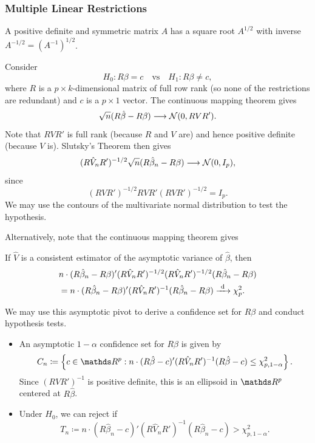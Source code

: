 \documentclass[letterpaper, 10pt]{article}
\begin{document}
\subsubsection{Multiple Linear Restrictions}
\begin{proposition}
  A positive definite and symmetric matrix \(A\) has a square root \(A^{1 / 2}\) with inverse \(A^{-1 / 2} = (A^{-1})^{1 / 2}\).
\end{proposition}

Consider
\[
  H_0: R \beta = c \quad\text{vs}\quad H_1: R \beta \neq c,
\]
where \(R\) is a \(p \times k\)-dimensional matrix of full row rank (so none of the restrictions are redundant) and \(c\) is a \(p \times 1\) vector.
The continuous mapping theorem gives
\[
  \sqrt{n} (R \hat{\beta} - R \beta)
  \longrightarrow \mathcal{N}(0, RVR').
\]
Note that \(R V R'\) is full rank (because \(R\) and \(V\) are) and hence positive definite (because \(V\) is).
Slutsky's Theorem then gives
\[
  (R \hat{V}_n R')^{- 1 / 2} \sqrt{n} (R \hat{\beta}_n - R \beta)
  \longrightarrow \mathcal{N}(0, I_p),
\]
since
\[
  (RVR')^{- 1 / 2} R V R' (R V R')^{- 1 / 2}
  = I_p.
\]
We may use the contours of the multivariate normal distribution to test the hypothesis.

Alternatively, note that the continuous mapping theorem gives
\begin{proposition}
  If \(\hat{V}\) is a consistent estimator of the asymptotic variance of \(\hat{\beta}\), then
  \begin{align*}
    &n \cdot (R \hat{\beta}_n - R \beta)' (R \hat{V}_n R')^{- 1 / 2} 
    (R \hat{V}_n R')^{- 1 / 2} (R \hat{\beta}_n - R \beta) \\
    &= n \cdot (R \hat{\beta}_n - R \beta)' (R \hat{V}_n R')^{-1} (R \hat{\beta}_n - R \beta)
    \xrightarrow{\ \mathrm{d}\ } \chi_p^2.
  \end{align*}
\end{proposition}

We may use this asymptotic pivot to derive a confidence set for \(R \beta\) and conduct hypothesis tests.
\begin{itemize}
  \item An asymptotic \(1 - \alpha\) confidence set for \(R \beta\) is given by
    \[
      C_n
      \coloneqq \left\{ c \in \RR^p: n \cdot (R \hat{\beta} - c)' (R \hat{V}_n R')^{-1} (R \hat{\beta} - c) \leq \chi_{p, 1 - \alpha}^2 \right\}.
    \]
    Since \((R V R')^{-1}\) is positive definite, this is an ellipsoid in \(\RR^p\) centered at \(R \hat{\beta}\).
  \item Under \(H_0\), we can reject if
    \[
      T_n
      \coloneqq n \cdot (R \hat{\beta}_n - c)' (R \hat{V}_n R')^{-1} (R \hat{\beta}_n - c)
      > \chi_{p, 1 - \alpha}^2.
    \]
\end{itemize}
\end{document}
